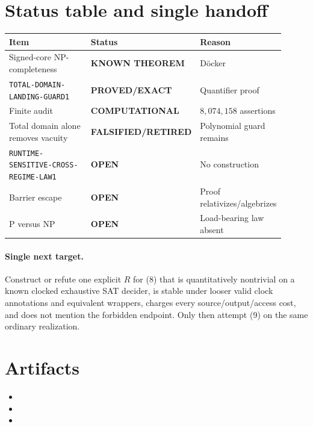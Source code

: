 \documentclass[11pt]{article}
\newcommand{\EXACT}{\textbf{PROVED/EXACT}}
\newcommand{\KNOWN}{\textbf{KNOWN THEOREM}}
\newcommand{\COMP}{\textbf{COMPUTATIONAL}}
\newcommand{\OPEN}{\textbf{OPEN}}
\newcommand{\RETIRED}{\textbf{FALSIFIED/RETIRED}}
\begin{document}
\section{Status table and single handoff}
\begin{center}
\begin{tabular}{p{0.45\linewidth}p{0.18\linewidth}p{0.28\linewidth}}
\toprule Item & Status & Reason\\ \midrule
Signed-core NP-completeness & \KNOWN & D\"ocker\\
\texttt{TOTAL-DOMAIN-LANDING-GUARD1} & \EXACT & Quantifier proof\\
Finite audit & \COMP & $8{,}074{,}158$ assertions\\
Total domain alone removes vacuity & \RETIRED & Polynomial guard remains\\
\texttt{RUNTIME-SENSITIVE-CROSS-REGIME-LAW1} & \OPEN & No construction\\
Barrier escape & \OPEN & Proof relativizes/algebrizes\\
P versus NP & \OPEN & Load-bearing law absent\\
\bottomrule
\end{tabular}
\end{center}

\paragraph{Single next target.}
Construct or refute one explicit $R$ for (8) that is quantitatively nontrivial
on a known clocked exhaustive SAT decider, is stable under looser valid clock
annotations and equivalent wrappers, charges every source/output/access cost,
and does not mention the forbidden endpoint.  Only then attempt (9) on the
same ordinary realization.

\section{Artifacts}
\begin{itemize}
\item {}
\item {}
\item {}
\end{itemize}
\end{document}
